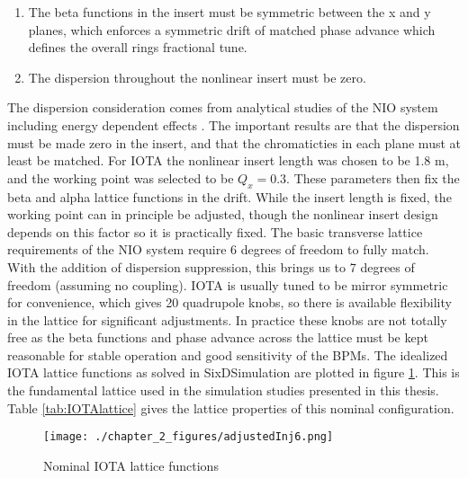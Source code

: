 \begin{enumerate}
	\item The beta functions in the insert must be symmetric between the x and y planes, which enforces a symmetric drift of matched phase advance which defines the overall rings fractional tune.
	\item The dispersion throughout the nonlinear insert must be zero.
\end{enumerate}

The dispersion consideration comes from analytical studies of the NIO system including energy dependent effects \cite{webbChromaticDispersiveEffects2015}. The important results are that the dispersion must be made zero in the insert, and that the chromaticties in each plane must at least be matched. For IOTA the nonlinear insert length was chosen to be 1.8 m, and the working point was selected to be $Q_x=0.3$. These parameters then fix the beta and alpha lattice functions in the drift. While the insert length is fixed, the working point can in principle be adjusted, though the nonlinear insert design depends on this factor so it is practically fixed. The basic transverse lattice requirements of the NIO system require 6 degrees of freedom to fully match. With the addition of dispersion suppression, this brings us to 7 degrees of freedom (assuming no coupling). IOTA is usually tuned to be mirror symmetric for convenience, which gives 20 quadrupole knobs, so there is available flexibility in the lattice for significant adjustments. In practice these knobs are not totally free as the beta functions and phase advance across the lattice must be kept reasonable for stable operation and good sensitivity of the BPMs. The idealized IOTA lattice functions as solved in SixDSimulation are plotted in figure \ref{fig:IOTAinj6}. This is the fundamental lattice used in the simulation studies presented in this thesis. Table \ref{tab:IOTAlattice} gives the lattice properties of this nominal configuration.

\begin{figure}
	\centering
	\texttt{[image: ./chapter\_2\_figures/adjustedInj6.png]}
	\caption{Nominal IOTA lattice functions}
	\label{fig:IOTAinj6}
\end{figure}


